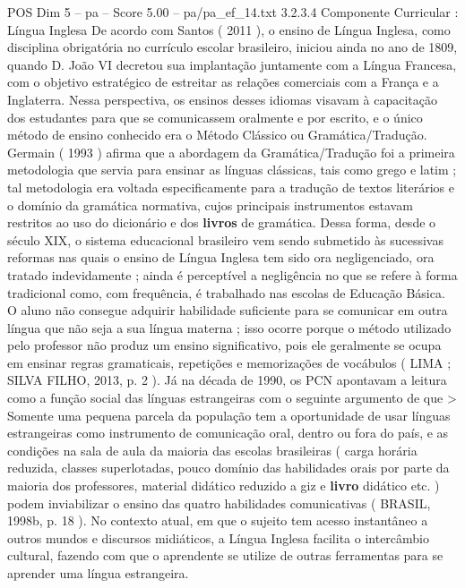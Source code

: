 \begin{textsample}{POS Dim 5 – pa – Score 5.00 – pa/pa\_ef\_14.txt}  \label{ex:f5_pos_245}
3.2.3.4 Componente Curricular : Língua Inglesa De acordo com Santos ( 2011 ), o ensino de Língua Inglesa, como disciplina obrigatória no currículo escolar brasileiro, iniciou ainda no ano de 1809, quando D.
João VI decretou sua implantação juntamente com a Língua Francesa, com o objetivo estratégico de estreitar as relações comerciais com a França e a Inglaterra.
Nessa perspectiva, os ensinos desses idiomas visavam à capacitação dos estudantes para que se comunicassem oralmente e por escrito, e o único método de ensino conhecido era o Método Clássico ou Gramática/Tradução.
Germain ( 1993 ) afirma que a abordagem da Gramática/Tradução foi a primeira metodologia que servia para ensinar as línguas clássicas, tais como grego e latim ; tal metodologia era voltada especificamente para a tradução de textos literários e o domínio da gramática normativa, cujos principais instrumentos estavam restritos ao uso do dicionário e dos \textbf{livros} de gramática.
Dessa forma, desde o século XIX, o sistema educacional brasileiro vem sendo submetido às sucessivas reformas nas quais o ensino de Língua Inglesa tem sido ora negligenciado, ora tratado indevidamente ; ainda é perceptível a negligência no que se refere à forma tradicional como, com frequência, é trabalhado nas escolas de Educação Básica.
O aluno não consegue adquirir habilidade suficiente para se comunicar em outra língua que não seja a sua língua materna ; isso ocorre porque o método utilizado pelo professor não produz um ensino significativo, pois ele geralmente se ocupa em ensinar regras gramaticais, repetições e memorizações de vocábulos ( LIMA ; SILVA FILHO, 2013, p. 2 ).
Já na década de 1990, os PCN apontavam a leitura como a função social das línguas estrangeiras com o seguinte argumento de que > Somente uma pequena parcela da população tem a oportunidade de usar línguas estrangeiras como instrumento de comunicação oral, dentro ou fora do país, e as condições na sala de aula da maioria das escolas brasileiras ( carga horária reduzida, classes superlotadas, pouco domínio das habilidades orais por parte da maioria dos professores, material didático reduzido a giz e \textbf{livro} didático etc. ) podem inviabilizar o ensino das quatro habilidades comunicativas ( BRASIL, 1998b, p. 18 ).
No contexto atual, em que o sujeito tem acesso instantâneo a outros mundos e discursos midiáticos, a Língua Inglesa facilita o intercâmbio cultural, fazendo com que o aprendente se utilize de outras ferramentas para se aprender uma língua estrangeira.

\end{textsample}
